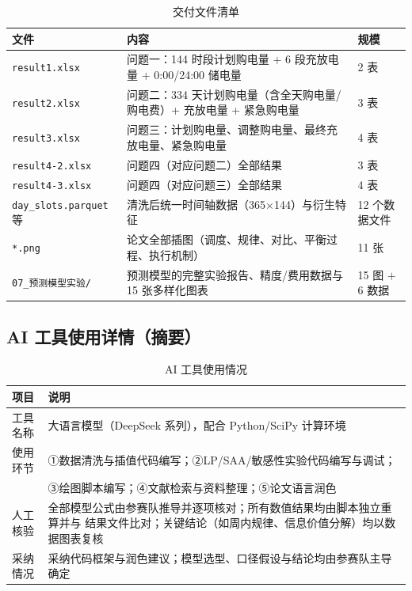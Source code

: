 \documentclass[12pt,a4paper,fontset=fandol]{ctexart}
\begin{document}
\begin{table}[htbp]
\centering
\caption{交付文件清单}
\label{tab:deliver}
\begin{tabularx}{\textwidth}{@{}lLl@{}}
\toprule
文件 & 内容 & 规模 \\
\midrule
\texttt{result1.xlsx} & 问题一\nobreak：144 时段计划购电量 + 6 段充放电量 + 0:00/24:00 储电量 & 2 表 \\
\texttt{result2.xlsx} & 问题二\nobreak：334 天计划购电量（含全天购电量/购电费\nobreak）+ 充放电量 + 紧急购电量 & 3 表 \\
\texttt{result3.xlsx} & 问题三\nobreak：计划购电量\nobreak、调整购电量\nobreak、最终充放电量\nobreak、紧急购电量 & 4 表 \\
\texttt{result4-2.xlsx} & 问题四（对应问题二\nobreak）全部结果 & 3 表 \\
\texttt{result4-3.xlsx} & 问题四（对应问题三\nobreak）全部结果 & 4 表 \\
\texttt{day\_slots.parquet} 等 & 清洗后统一时间轴数据（365$\times$144\nobreak）与衍生特征 & 12 个数据文件 \\
\texttt{*.png} & 论文全部插图（调度\nobreak、规律\nobreak、对比\nobreak、平衡过程\nobreak、执行机制\nobreak） & 11 张 \\
\texttt{07\_预测模型实验/} & 预测模型的完整实验报告\nobreak、精度/费用数据与 15 张多样化图表 & 15 图 $+$ 6 数据 \\
\bottomrule
\end{tabularx}
\end{table}

\subsection{AI 工具使用详情（摘要\nobreak）}

\begin{table}[htbp]
\centering
\caption{AI 工具使用情况}
\label{tab:ai}
\begin{tabularx}{\textwidth}{@{}p{3.2cm}X@{}}
\toprule
项目 & 说明 \\
\midrule
工具名称 & 大语言模型（DeepSeek 系列\nobreak）\nobreak，配合 Python/SciPy 计算环境 \\
使用环节 & ①数据清洗与插值代码编写\nobreak；②LP/SAA/敏感性实验代码编写与调试\nobreak；\\
 & ③绘图脚本编写\nobreak；④文献检索与资料整理\nobreak；⑤论文语言润色 \\
人工核验 & 全部模型公式由参赛队推导并逐项核对\nobreak；所有数值结果均由脚本独立重算并与
结果文件比对\nobreak；关键结论（如周内规律\nobreak、信息价值分解\nobreak）均以数据图表复核 \\
采纳情况 & 采纳代码框架与润色建议\nobreak；模型选型\nobreak、口径假设与结论均由参赛队主导确定 \\
\bottomrule
\end{tabularx}
\end{table}
\end{document}
